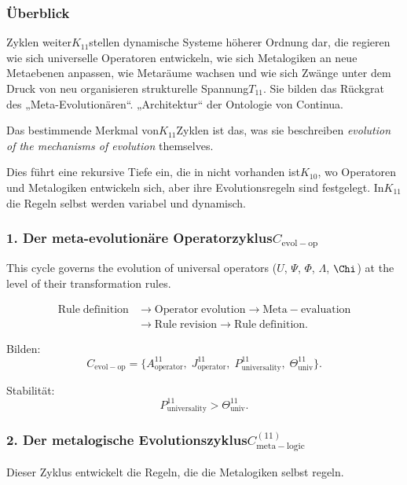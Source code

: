 \subsubsection{Überblick}

Zyklen weiter$K_{11}$stellen dynamische Systeme höherer Ordnung dar, die regieren
wie sich universelle Operatoren entwickeln, wie sich Metalogiken an neue Metaebenen anpassen,
wie Metaräume wachsen und wie sich Zwänge unter dem Druck von neu organisieren
strukturelle Spannung$T_{11}$. Sie bilden das Rückgrat des „Meta-Evolutionären“.
„Architektur“ der Ontologie von Continua.

Das bestimmende Merkmal von$K_{11}$Zyklen ist das, was sie beschreiben
\emph{evolution of the mechanisms of evolution} themselves.

Dies führt eine rekursive Tiefe ein, die in nicht vorhanden ist$K_{10}$, wo Operatoren
und Metalogiken entwickeln sich, aber ihre Evolutionsregeln sind festgelegt.
In$K_{11}$die Regeln selbst werden variabel und dynamisch.


\subsubsection{1. Der meta-evolutionäre Operatorzyklus$C_{\mathrm{evol-op}}$}

This cycle governs the evolution of universal operators ($U$, $\Psi$, $\Phi$,
$\Lambda$, $\Chi$) at the level of their transformation rules.

\[
  \begin{aligned}
  \mathrm{Rule\;definition}
  &\to \mathrm{Operator\;evolution}
  \to \mathrm{Meta\!-\!evaluation}\\
  &\to \mathrm{Rule\;revision}
  \to \mathrm{Rule\;definition}.
  \end{aligned}
\]

Bilden:
\[
  C_{\mathrm{evol-op}}
  =
  \{
    A^{11}_{\mathrm{operator}},\;
    J^{11}_{\mathrm{operator}},\;
    P^{11}_{\mathrm{universality}},\;
    \Theta^{11}_{\mathrm{univ}}
  \}.
\]

Stabilität:
\[
  P^{11}_{\mathrm{universality}}>\Theta^{11}_{\mathrm{univ}}.
\]


\subsubsection{2. Der metalogische Evolutionszyklus$C_{\mathrm{meta\!-\!logic}}^{(11)}$}

Dieser Zyklus entwickelt die Regeln, die die Metalogiken selbst regeln.

